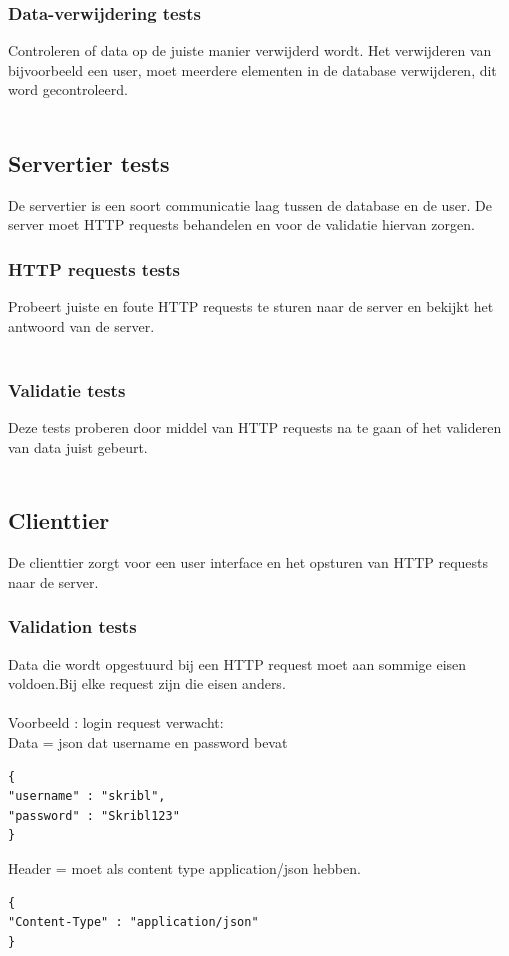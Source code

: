 \documentclass{article}
\begin{document}
\subsubsection{Data-verwijdering tests}
Controleren of data op de juiste manier verwijderd wordt. Het verwijderen van bijvoorbeeld een user, moet meerdere elementen in de database verwijderen, dit word gecontroleerd.
\\
\\
\subsection{Servertier tests}
De servertier is een soort communicatie laag tussen de database en de user. De server moet HTTP requests behandelen en voor de validatie hiervan zorgen.

\subsubsection{HTTP requests tests}
Probeert juiste en foute HTTP requests te sturen naar de server en bekijkt het antwoord van de server.
\\
\\
\subsubsection{Validatie tests}
Deze tests proberen door middel van HTTP requests na te gaan of het valideren van data juist gebeurt.
\\
\\
\subsection{Clienttier}
De clienttier zorgt voor een user interface en het opsturen van HTTP requests naar de server. 
\subsubsection{Validation tests}
Data die wordt opgestuurd bij een HTTP request moet aan sommige eisen voldoen.Bij elke request zijn die eisen anders.
\\
\\
Voorbeeld : login request verwacht:
\\
Data = json dat username en password bevat
\begin{verbatim}
{
"username" : "skribl",
"password" : "Skribl123"
}
\end{verbatim}
Header = moet als content type application/json hebben.
\begin{verbatim}
{
"Content-Type" : "application/json"
}
\end{verbatim}
\end{document}
